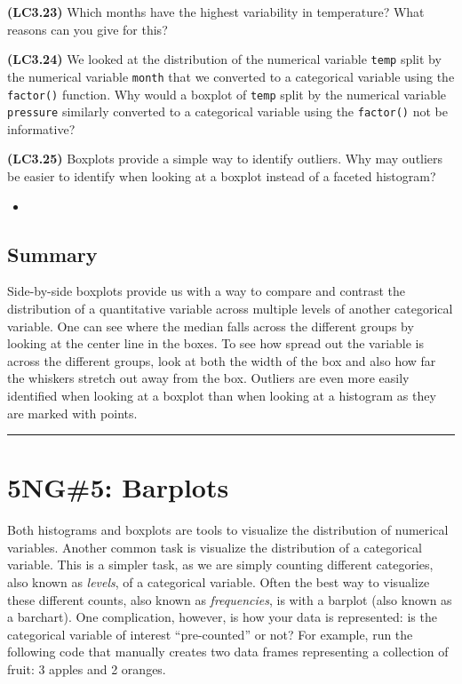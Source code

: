\documentclass[12pt, krantz2,]{krantz}
\newenvironment{rmdblock}[1]
  {\begin{shaded*}
  \begin{itemize}
  \renewcommand{\labelitemi}{
    \raisebox{-.7\height}[0pt][0pt]{
    }
  }
  \item
  }
  {
  \end{itemize}
  \end{shaded*}
  }
\newenvironment{learncheck}
  {\begin{rmdblock}{warning}}
  {\end{rmdblock}}
\begin{document}
\textbf{(LC3.23)} Which months have the highest variability in temperature? What reasons can you give for this?

\textbf{(LC3.24)} We looked at the distribution of the numerical variable \texttt{temp} split by the numerical variable \texttt{month} that we converted to a categorical variable using the \texttt{factor()} function. Why would a boxplot of \texttt{temp} split by the numerical variable \texttt{pressure} similarly converted to a categorical variable using the \texttt{factor()} not be informative?

\textbf{(LC3.25)} Boxplots provide a simple way to identify outliers. Why may outliers be easier to identify when looking at a boxplot instead of a faceted histogram?

\begin{learncheck}

\end{learncheck}

\hypertarget{summary-3}{%
\subsection{Summary}\label{summary-3}}

Side-by-side boxplots provide us with a way to compare and contrast the distribution of a quantitative variable across multiple levels of another categorical variable. One can see where the median falls across the different groups by looking at the center line in the boxes. To see how spread out the variable is across the different groups, look at both the width of the box and also how far the whiskers stretch out away from the box. Outliers are even more easily identified when looking at a boxplot than when looking at a histogram as they are marked with points.

\begin{center}\rule{0.5\linewidth}{\linethickness}\end{center}

\hypertarget{geombar}{%
\section{5NG\#5: Barplots}\label{geombar}}

Both histograms and boxplots are tools to visualize the distribution of numerical variables. Another common task is visualize the distribution of a categorical variable. This is a simpler task, as we are simply counting different categories, also known as \emph{levels}, of a categorical variable. Often the best way to visualize these different counts, also known as \emph{frequencies}, is with a barplot (also known as a barchart). One complication, however, is how your data is represented: is the categorical variable of interest ``pre-counted'' or not? For example, run the following code that manually creates two data frames representing a collection of fruit: 3 apples and 2 oranges.
\end{document}

